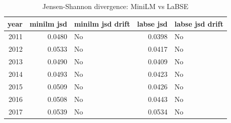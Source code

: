 \begin{table}[ht]
\centering
\caption{Jensen-Shannon divergence: MiniLM vs LaBSE}
\label{tab:minilm_vs_labse_jsd}
\begin{tabular}{rrlrl}
\toprule
year & minilm jsd & minilm jsd drift & labse jsd & labse jsd drift \\
\midrule
2011 & 0.0480 & No & 0.0398 & No \\
2012 & 0.0533 & No & 0.0417 & No \\
2013 & 0.0490 & No & 0.0409 & No \\
2014 & 0.0493 & No & 0.0423 & No \\
2015 & 0.0509 & No & 0.0426 & No \\
2016 & 0.0508 & No & 0.0443 & No \\
2017 & 0.0539 & No & 0.0534 & No \\
\bottomrule
\end{tabular}
\end{table}

